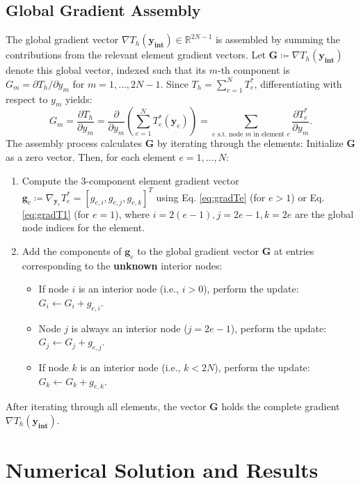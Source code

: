 \documentclass[11pt]{article}
\begin{document}
 


\subsection{Global Gradient Assembly}

The global gradient vector \( \nabla T_h(\mathbf{y_\text{int}}) \in \mathbb{R}^{2N-1} \) is assembled by summing the contributions from the relevant element gradient vectors. Let \( \mathbf{G} \coloneqq \nabla T_h(\mathbf{y_\text{int}}) \) denote this global vector, indexed such that its $m$-th component is \( G_m = \partial T_h / \partial y_m \) for \( m=1, \dots, 2N-1 \). Since \( T_h = \sum_{e=1}^{N} T_e^* \), differentiating with respect to \( y_m \) yields:
\[
    G_m = \frac{\partial T_h}{\partial y_{m}} = \frac{\partial}{\partial y_{m}} \left( \sum_{e=1}^{N} T_e^*(\mathbf{y}_e) \right) = \sum_{e \text{ s.t. node } m \text{ in element } e} \frac{\partial T_e^*}{\partial y_{m}}.
\]
The assembly process calculates \( \mathbf{G} \) by iterating through the elements: Initialize \( \mathbf{G} \) as a zero vector. Then, for each element \( e = 1, \dots, N \):
\begin{enumerate}
    \item Compute the 3-component element gradient vector \( \mathbf{g}_e \coloneqq \nabla_{\mathbf{y}_e} T_e^* = [g_{e,i}, g_{e,j}, g_{e,k}]^T \) using Eq. \eqref{eq:gradTe} (for \(e > 1\)) or Eq. \eqref{eq:gradT1} (for \(e=1\)), where \(i=2(e-1), j=2e-1, k=2e\) are the global node indices for the element.
    \item Add the components of \( \mathbf{g}_e \) to the global gradient vector \( \mathbf{G} \) at entries corresponding to the \textbf{unknown} interior nodes:
    \begin{itemize}
        \item If node \( i \) is an interior node (i.e., \( i > 0 \)), perform the update: \( G_i \leftarrow G_i + g_{e,i} \).
        \item Node \( j \) is always an interior node (\( j = 2e-1 \)), perform the update: \( G_j \leftarrow G_j + g_{e,j} \).
        \item If node \( k \) is an interior node (i.e., \( k < 2N \)), perform the update: \( G_k \leftarrow G_k + g_{e,k} \).
    \end{itemize}
\end{enumerate}
After iterating through all elements, the vector \( \mathbf{G} \) holds the complete gradient \( \nabla T_h(\mathbf{y_\text{int}}) \).
\section{Numerical Solution and Results}
\end{document}
